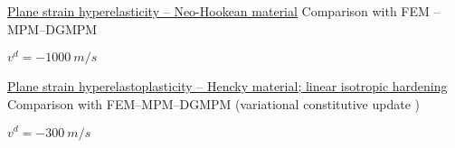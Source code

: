 
\begin{frame}{\href{section4/animation/hyperelasticity_velo/video.mp4}{Plane strain hyperelasticity -- Neo-Hookean material}}
  \footnotesize Comparison with FEM \cite{Abaqus}--MPM--DGMPM
  \begin{overprint}
    \vspace{0.5cm}
    \begin{center}
      
      \footnotesize $v^d = -1000 \: m/s$
    \end{center}

    \vspace{0.cm}
    \begin{center}
    \end{center}
  \end{overprint}
\end{frame}

\begin{frame}{\href{section4/animation/hyperelastoplasticity/video.mp4}{Plane strain hyperelastoplasticity -- Hencky material; linear isotropic hardening}}
  \footnotesize Comparison with FEM--MPM--DGMPM (variational constitutive update \cite{LaurentVariational})
  \begin{overprint}
    \vspace{0.25cm}
    \begin{center}
      
      \footnotesize $v^d = -300 \: m/s$
    \end{center}
    \vspace{0.cm}
    \begin{center}
    \end{center}
  \end{overprint}
\end{frame}
